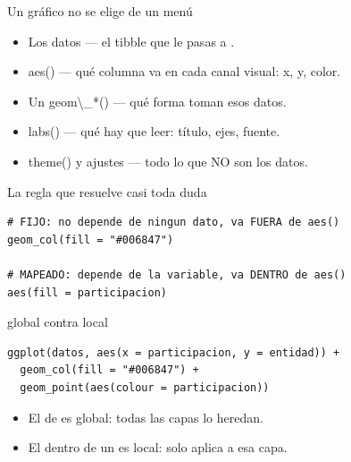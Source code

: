 \begin{frame}{Un gráfico no se elige de un menú}
  \vspace{0.2em}
  \begin{itemize}\setlength{\itemsep}{0.75em}
    \item<1-> \ac{Los datos} — el tibble que le pasas a .
    \item<2-> \ac{aes()} — qué columna va en cada canal visual: x, y,
          color.
    \item<3-> \ac{Un geom\_*()} — qué forma toman esos datos.
    \item<4-> \ac{labs()} — qué hay que leer: título, ejes, fuente.
    \item<5-> \ac{theme() y ajustes} — todo lo que NO son los datos.
  \end{itemize}

  \vspace{1.0em}
\end{frame}

\begin{frame}[fragile]{La regla que resuelve casi toda duda}
\begin{lstlisting}
# FIJO: no depende de ningun dato, va FUERA de aes()
geom_col(fill = "#006847")

# MAPEADO: depende de la variable, va DENTRO de aes()
aes(fill = participacion)
\end{lstlisting}

  \vspace{0.7em}
\end{frame}

\begin{frame}[fragile]{ global contra  local}
\begin{lstlisting}
ggplot(datos, aes(x = participacion, y = entidad)) +
  geom_col(fill = "#006847") +
  geom_point(aes(colour = participacion))
\end{lstlisting}

  \vspace{0.6em}
  \begin{itemize}\setlength{\itemsep}{0.8em}
    \item<1-> El  de  es \ac{global}: todas las
          capas lo heredan.
    \item<2-> El  dentro de un  es \ac{local}:
          solo aplica a esa capa.
  \end{itemize}

  \vspace{0.8em}
\end{frame}

